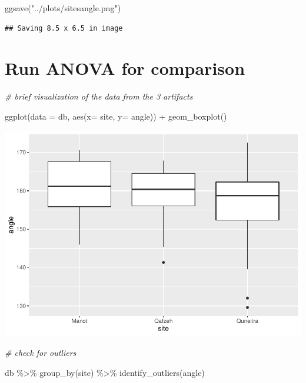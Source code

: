 \documentclass[
]{article}
\newenvironment{Shaded}{\begin{snugshade}}{\end{snugshade}}
\newcommand{\AttributeTok}[1]{\textcolor[rgb]{0.77,0.63,0.00}{#1}}
\newcommand{\CommentTok}[1]{\textcolor[rgb]{0.56,0.35,0.01}{\textit{#1}}}
\newcommand{\FunctionTok}[1]{\textcolor[rgb]{0.00,0.00,0.00}{#1}}
\newcommand{\NormalTok}[1]{#1}
\newcommand{\SpecialCharTok}[1]{\textcolor[rgb]{0.00,0.00,0.00}{#1}}
\newcommand{\StringTok}[1]{\textcolor[rgb]{0.31,0.60,0.02}{#1}}
\begin{document}
\begin{Shaded}
\begin{Highlighting}[]
\FunctionTok{ggsave}\NormalTok{(}\StringTok{"../plots/sitesangle.png"}\NormalTok{)}
\end{Highlighting}
\end{Shaded}

\begin{verbatim}
## Saving 8.5 x 6.5 in image
\end{verbatim}

\hypertarget{run-anova-for-comparison}{%
\section{Run ANOVA for comparison}\label{run-anova-for-comparison}}

\begin{Shaded}
\begin{Highlighting}[]
\CommentTok{\# brief visualization of the data from the 3 artifacts}

\FunctionTok{ggplot}\NormalTok{(}\AttributeTok{data =}\NormalTok{ db, }\FunctionTok{aes}\NormalTok{(}\AttributeTok{x=}\NormalTok{ site, }\AttributeTok{y=}\NormalTok{ angle)) }\SpecialCharTok{+}
  \FunctionTok{geom\_boxplot}\NormalTok{()}
\end{Highlighting}
\end{Shaded}

\includegraphics{incisionangles_files/figure-latex/unnamed-chunk-6-1.pdf}

\begin{Shaded}
\begin{Highlighting}[]
\CommentTok{\# check for outliers}

\NormalTok{db }\SpecialCharTok{\%\textgreater{}\%}
  \FunctionTok{group\_by}\NormalTok{(site) }\SpecialCharTok{\%\textgreater{}\%}
  \FunctionTok{identify\_outliers}\NormalTok{(angle)}
\end{Highlighting}
\end{Shaded}
\end{document}
